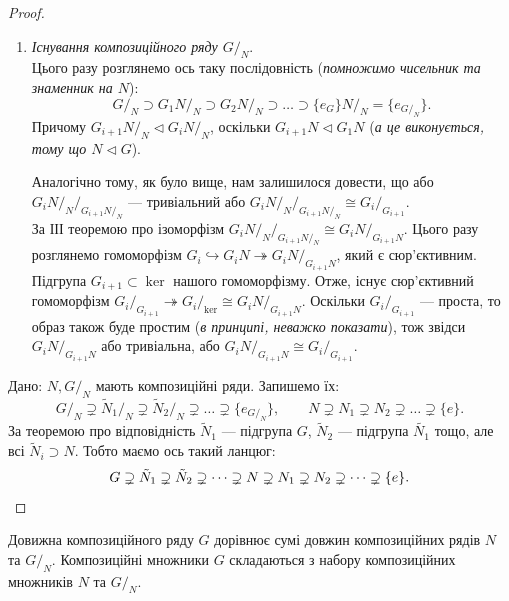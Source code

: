 \documentclass{math_library}
\begin{document}
\begin{proof}
\begin{enumerate}[wide=0pt,label={\Roman*.}]
\item \textit{Існування композиційного ряду $G/_N$}.\\
Цього разу розглянемо ось таку послідовність (\textit{помножимо чисельник та знаменник на $N$}):
\[ 
G/_N \supset {G_1N}/_N \supset {G_2N}/_N \supset \dots \supset {\{e_G\} N}/_N = \{e_{G/_N}\}.
\]
Причому ${G_{i+1}N}/_N \triangleleft {G_i N}/_N$, оскільки $G_{i+1}N \triangleleft G_1 N$ (\textit{а це виконується, тому що $N \triangleleft G$}).

Аналогічно тому, як було вище, нам залишилося довести, що або ${{G_i N}/_N}/_{{G_{i+1}N}/_N}$ --- тривіальний або ${{G_i N}/_N}/_{{G_{i+1}N}/_N} \cong {G_i}/_{G_{i+1}}$.\\
За ІІІ теоремою про ізоморфізм ${{G_i N}/_N}/_{{G_{i+1}N}/_N} \cong {G_i N}/_{G_{i+1} N}$. Цього разу розглянемо гомоморфізм $G_i \hookrightarrow G_i N \twoheadrightarrow {G_i N}/_{G_{i+1}N}$, який є сюр'єктивним. Підгрупа $G_{i+1} \subset \ker$ нашого гомоморфізму. Отже, існує сюр'єктивний гомоморфізм ${G_i}/_{G_{i+1}} \twoheadrightarrow {G_i}/_{\ker} \cong {G_iN}/_{G_{i+1}N}$. Оскільки ${G_i}/_{G_{i+1}}$ --- проста, то образ також буде простим (\textit{в принципі, неважко показати}), тож звідси ${G_iN}/_{G_{i+1}N}$ або тривіальна, або ${G_iN}/_{G_{i+1}N} \cong {G_i}/_{G_{i+1}}$.
\end{enumerate}

\leftproof Дано: $N,G/_N$ мають композиційні ряди. Запишемо їх:
\[
G/_N \supsetneq {\tilde{N}_1}/_N \supsetneq {\tilde{N}_2}/_N  \supsetneq \dots \supsetneq \{e_{G/_N}\}, \qquad N \supsetneq N_1 \supsetneq N_2 \supsetneq \dots \supsetneq \{e\}.
\]
За теоремою про відповідність $\tilde{N}_1$ --- підгрупа $G$, $\tilde{N}_2$ --- підгрупа $\tilde{N_1}$ тощо, але всі $\tilde{N}_i \supset N$. Тобто маємо ось такий ланцюг:
\[
G \supsetneq \tilde{N}_1 \supsetneq \tilde{N}_2 \supsetneq \dots \supsetneq N \supsetneq N_1 \supsetneq N_2 \supsetneq \dots \supsetneq \{e\}. \qedhere
\]
\end{proof}

\begin{corollary}
Довижна композиційного ряду $G$ дорівнює сумі довжин композиційних рядів $N$ та $G/_N$. Композиційні множники $G$ складаються з набору композиційних множників $N$ та $G/_N$.
\end{corollary}

\end{document}
